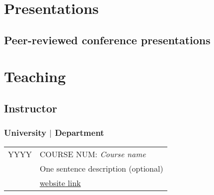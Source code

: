 \documentclass[11pt]{article}
\newcommand{\RR}{\raggedright\arraybackslash} %
\begin{document}


\section*{Presentations}
\subsection*{Peer-reviewed conference presentations}
\begin{refsection}
\nocite{*}
\printbibliography[heading = none,
keyword = conference,               %
keyword = peer,                     %
env = mybib,
check = recent]                     %
\end{refsection}                    %




\section*{Teaching}

\subsection*{Instructor}

\subsubsection*{University $\mid$ Department}
\begin{tabularx}{\linewidth}{>{\RR}p{1in}>{\RR}X}
YYYY&COURSE NUM: \textit{Course name} \\
&\hspace{1em}One sentence description (optional)  \\
&\hspace{1em}{\itshape Website/Course materials:}
\href{}{website link} \\
\end{tabularx}
\end{document}
